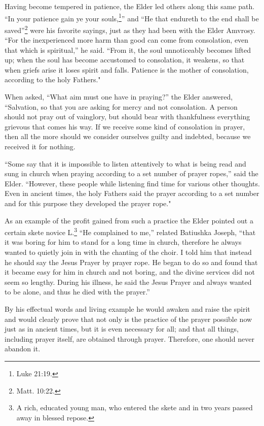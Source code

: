 Having become tempered in patience, the Elder led others along this same path. “In your patience gain ye your souls,\footnote{Luke 21:19.}'' and “He that endureth to the end shall be saved”\footnote{Matt. 10:22.} were his favorite sayings, just as they had been with the Elder Amvrosy. “For the inexperienced more harm than good can come from consolation, even that which is spiritual,” he said. “From it, the soul unnoticeably becomes lifted up; when the soul has become accustomed to consolation, it weakens, so that when griefs arise it loses spirit and falls. Patience is the mother of consolation, according to the holy Fathers."

When asked, “What aim must one have in praying?” the Elder answered, “Salvation, so that you are asking for mercy and not consolation. A person should not pray out of vainglory, but should bear with thankfulness everything grievous that comes his way. If we receive some kind of consolation in prayer, then all the more should we consider ourselves guilty and indebted, because we received it for nothing.

“Some say that it is impossible to listen attentively to what is being read and sung in church when praying according to a set number of prayer ropes,” said the Elder. “However, these people while listening find time for various other thoughts. Even in ancient times, the holy Fathers said the prayer according to a set number and for this purpose they developed the prayer rope."

As an example of the profit gained from such a practice the Elder pointed out a certain skete novice L.\footnote{A rich, educated young man, who entered the skete and in two years passed away in blessed repose.} “He complained to me,” related Batiushka Joseph, “that it was boring for him to stand for a long time in church, therefore he always wanted to quietly join in with the chanting of the choir. I told him that instead he should say the Jesus Prayer by prayer rope. He began to do so and found that it became easy for him in church and not boring, and the divine services did not seem so lengthy. During his illness, he said the Jesus Prayer and always wanted to be alone, and thus he died with the prayer.”

By his effectual words and living example he would awaken and raise the spirit and would clearly prove that not only is the practice of the prayer possible now just as in ancient times, but it is even necessary for all; and that all things, including prayer itself, are obtained through prayer. Therefore, one should never abandon it.

